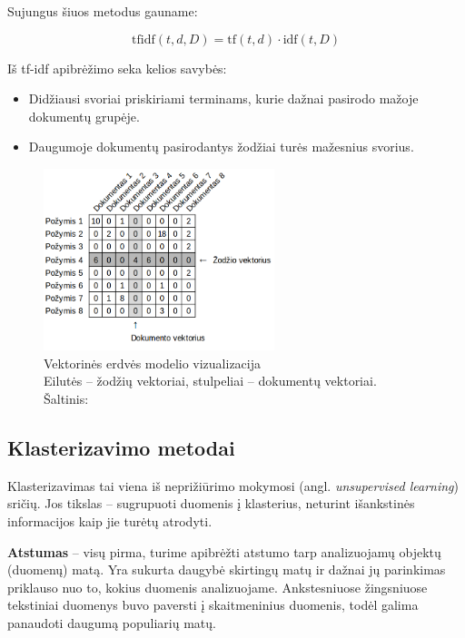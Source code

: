 \documentclass{VUMIFInfBakalaurinis}
\begin{document}
Sujungus šiuos metodus gauname:

$${\displaystyle \mathrm {tfidf} (t,d,D)=\mathrm {tf} (t,d)\cdot \mathrm {idf} (t,D)}$$

Iš tf-idf apibrėžimo seka kelios savybės:

\begin{itemize}
\item
  Didžiausi svoriai priskiriami terminams, kurie dažnai pasirodo mažoje
  dokumentų grupėje.
\item
  Daugumoje dokumentų pasirodantys žodžiai turės mažesnius svorius.
\end{itemize}

\begin{figure}[H]
	\centering
	\includegraphics[width=0.6\textwidth]{./img/image25.png}
  \caption{Vektorinės erdvės modelio vizualizacija\\
  Eilutės -- žodžių vektoriai, stulpeliai -- dokumentų vektoriai.\\
  Šaltinis: \cite{marksberry2014employee}}
\end{figure}

\subsection{Klasterizavimo metodai}\label{clustering}

Klasterizavimas tai viena iš neprižiūrimo mokymosi (angl.
\emph{unsupervised learning}) sričių. Jos tikslas -- sugrupuoti duomenis
į klasterius, neturint išankstinės informacijos kaip jie turėtų
atrodyti.

\textbf{Atstumas} -- visų pirma, turime apibrėžti atstumo tarp
  analizuojamų objektų (duomenų) matą. Yra sukurta daugybė skirtingų
  matų ir dažnai jų parinkimas priklauso nuo to, kokius duomenis
  analizuojame. Ankstesniuose žingsniuose tekstiniai duomenys buvo
  paversti į skaitmeninius duomenis, todėl galima panaudoti daugumą
  populiarių matų.
\end{document}
